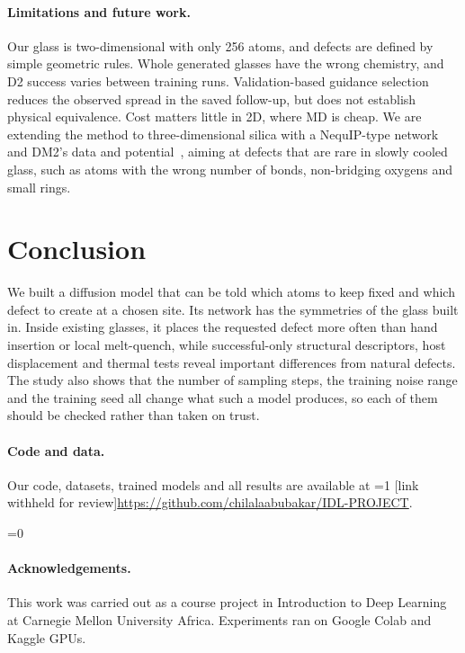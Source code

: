 \documentclass[10pt]{article}
\newcommand{\anonymous}{0}
\newcommand{\repo}{\ifnum\anonymous=1 [link withheld for review]\else\url{https://github.com/chilalaabubakar/IDL-PROJECT}\fi}
\begin{document}
\paragraph{Limitations and future work.} Our glass is two-dimensional with only 256 atoms, and defects are defined by simple geometric rules. Whole generated glasses have the wrong chemistry, and D2 success varies between training runs. Validation-based guidance selection reduces the observed spread in the saved follow-up, but does not establish physical equivalence. Cost matters little in 2D, where MD is cheap. We are extending the method to three-dimensional silica with a NequIP-type network~\citep{batzner2022nequip} and DM2's data and potential~\citep{bouhadja2013}, aiming at defects that are rare in slowly cooled glass, such as atoms with the wrong number of bonds, non-bridging oxygens and small rings.

\section{Conclusion}

We built a diffusion model that can be told which atoms to keep fixed and which defect to create at a chosen site. Its network has the symmetries of the glass built in. Inside existing glasses, it places the requested defect more often than hand insertion or local melt-quench, while successful-only structural descriptors, host displacement and thermal tests reveal important differences from natural defects. The study also shows that the number of sampling steps, the training noise range and the training seed all change what such a model produces, so each of them should be checked rather than taken on trust.

\paragraph{Code and data.} Our code, datasets, trained models and all results are available at \repo.

\ifnum\anonymous=0
\paragraph{Acknowledgements.} This work was carried out as a course project in Introduction to Deep Learning at Carnegie Mellon University Africa. Experiments ran on Google Colab and Kaggle GPUs.
\fi



\end{document}
